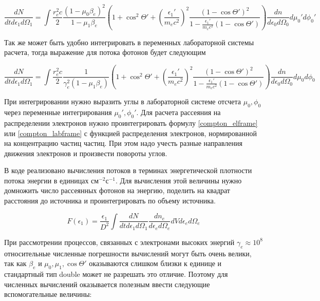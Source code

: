 \begin{equation} \label{compton_elframe}
\frac{dN}{dt d\epsilon_1 d\Omega_1}=\int \frac{r_e^2 c}{2} \frac{(1 - \mu_0 \beta_e)^2}{1-\mu_1\beta_e} \left(1 + \cos^2\Theta'+\left(\frac{\epsilon_1'}{m_e c^2}\right)^2\frac{(1-\cos\Theta')^2}{1-\frac{\epsilon_1'}{m_e c^2}(1 - \cos \Theta')}\right)\frac{dn}{d\epsilon_0 d\Omega_0}d\mu_0' d\phi_0'	
\end{equation}

Так же может быть удобно интегрировать в переменных лабораторной системы расчета, тогда выражение для потока фотонов будет следующим

\begin{equation}\label{compton_labframe}
\frac{dN}{dt d\epsilon_1 d\Omega_1}=\int \frac{r_e^2 c}{2} \frac{1}{\gamma_e^2(1-\mu_1\beta_e)} \left(1 + \cos^2\Theta'+\left(\frac{\epsilon_1'}{m_e c^2}\right)^2\frac{(1-\cos\Theta')^2}{1-\frac{\epsilon_1'}{m_e c^2}(1 - \cos \Theta')}\right)\frac{dn}{d\epsilon_0 d\Omega_0}d\mu_0 d\phi_0
\end{equation}

При интегрировании нужно выразить углы в лабораторной системе отсчета $\mu_0, \phi_0$ через переменные интегрирования $\mu_0', \phi_0'$. Для расчета рассеяния на распределении электронов нужно проинтегрировать формулу \ref{compton_elframe} или \ref{compton_labframe} с функцией распределения электронов, нормированной на концентрацию частиц частиц. При этом надо учесть разные направления движения электронов и произвести повороты углов.

В коде реализовано вычисления потоков в терминах энергетической плотности потока энергии в единицах $\textbf{см}^{-2}\textbf{с}^{-1}$. Для вычисления этой величины нужно домножить число рассеянных фотонов на энергию, поделить на квадрат расстояния до источника и проинтегрировать по объему источника.

\begin{equation}\label{comtonKlein}
F(\epsilon_1)=\frac{\epsilon_1}{D^2}\int \frac{dN}{dt d\epsilon_1 d\Omega_1} \frac{dn_e}{d\epsilon_e d\Omega_e} dV d\epsilon_e d\Omega_e
\end{equation}

При рассмотрении процессов, связанных с электронами высоких энергий $\gamma_e \approx 10^8$ относительные численные погрешности вычислений могут быть очень велики, так как $\beta_e$ и $\mu_0, \mu_1, \cos \Theta'$ оказываются слишком близки к единице и стандартный тип double может не разрешать это отличие. Поэтому для численных вычислений оказывается полезным ввести следующие вспомогательные величины:

